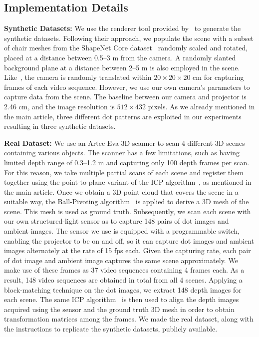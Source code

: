 \subsection{Implementation Details} \label{sec:c2_implementation}

\noindent\textbf{Synthetic Datasets:} We use the renderer tool provided by~\cite{riegler2019connecting} to generate the synthetic datasets. Following their approach, we populate the scene with a subset of chair meshes from the ShapeNet Core dataset~\cite{shapenet2015} randomly scaled and rotated, placed at a distance between 0.5--3 m from the camera. A randomly slanted background plane at a distance between 2--5 m is also employed in the scene. Like~\cite{riegler2019connecting}, the camera is randomly translated within $20 \times 20 \times 20$ cm for capturing frames of each video sequence. However, we use our own camera's parameters to capture data from the scene. The baseline between our camera and projector is 2.46 cm, and the image resolution is $512 \times 432$ pixels. As we already mentioned in the main article, three different dot patterns are exploited in our experiments resulting in three synthetic datasets.

\bigbreak\noindent\textbf{Real Dataset:} We use an Artec Eva 3D scanner to scan 4 different 3D scenes containing various objects. The scanner has a few limitations, such as having limited depth range of 0.3--1.2 m and capturing only 100 depth frames per scan. For this reason, we take multiple partial scans of each scene and register them together using the point-to-plane variant of the ICP algorithm~\cite{rusinkiewicz2001efficient}, as mentioned in the main article. Once we obtain a 3D point cloud that covers the scene in a suitable way, the Ball-Pivoting algorithm~\cite{bernardini99ball} is applied to derive a 3D mesh of the scene. This mesh is used as ground truth. Subsequently, we scan each scene with our own structured-light sensor as to capture 148 pairs of dot images and ambient images. The sensor we use is equipped with a programmable switch, enabling the projector to be on and off, so it can capture dot images and ambient images alternately at the rate of 15 fps each. Given the capturing rate, each pair of dot image and ambient image captures the same scene approximately. We make use of these frames as 37 video sequences containing 4 frames each. As a result, 148 video sequences are obtained in total from all 4 scenes. Applying a block-matching technique on the dot images, we extract 148 depth images for each scene. The same ICP algorithm~\cite{rusinkiewicz2001efficient} is then used to align the depth images acquired using the sensor and the ground truth 3D mesh in order to obtain transformation matrices among the frames. We made the real dataset, along with the instructions to replicate the synthetic datasets, publicly available.

